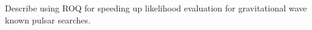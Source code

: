 Describe using ROQ for speeding up likelihood evaluation for gravitational wave known pulsar searches.
